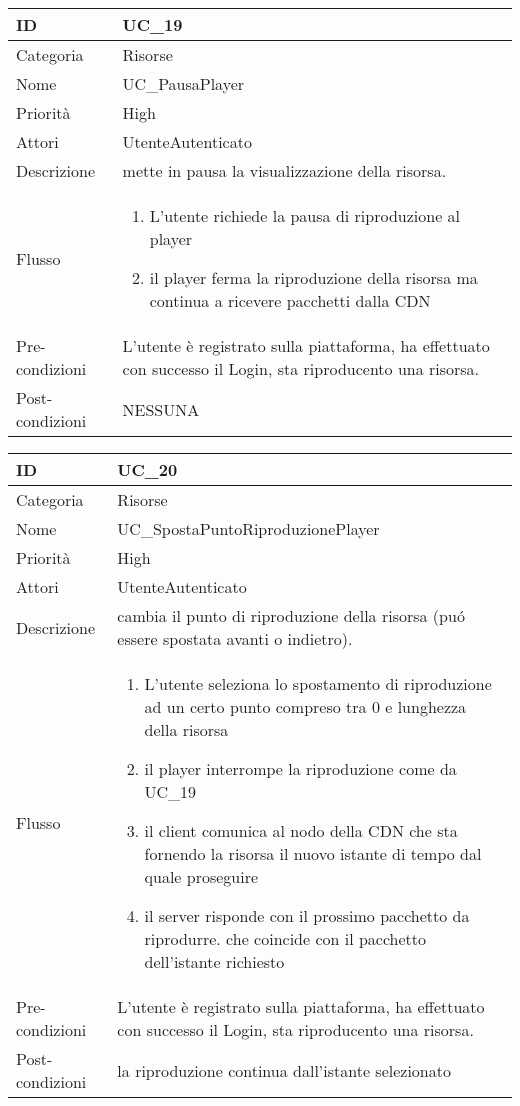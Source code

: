 \begin{center}
\begin{tabular}{ |p{2cm}|p{13cm}|  }
\hline
ID & UC\_19 \\\hline
Categoria & Risorse\\\hline
Nome & UC\_PausaPlayer\\\hline
Priorità & High \\\hline
Attori &  UtenteAutenticato \\\hline
Descrizione & mette in pausa la visualizzazione della risorsa.\\\hline
Flusso &  	\begin{enumerate}
			\item L'utente richiede la pausa di riproduzione al player
			\item il player ferma la riproduzione della risorsa ma continua a ricevere pacchetti dalla CDN 
			\end{enumerate}
			\\\hline
Pre-condizioni & L'utente è registrato sulla piattaforma, ha effettuato con successo il Login, sta riproducento una risorsa.\\\hline
Post-condizioni & NESSUNA\\\hline
\end{tabular}
\label{table_use_case:19}\newline

\begin{tabular}{ |p{2cm}|p{13cm}|  }
\hline
ID & UC\_20 \\\hline
Categoria & Risorse\\\hline
Nome & UC\_SpostaPuntoRiproduzionePlayer\\\hline
Priorità & High \\\hline
Attori &  UtenteAutenticato \\\hline
Descrizione & cambia il punto di riproduzione della risorsa (pu\'o essere spostata avanti o indietro).\\\hline
Flusso &  	\begin{enumerate}
			\item L'utente seleziona lo spostamento di riproduzione ad un certo punto compreso tra 0 e lunghezza della risorsa
			\item il player interrompe la riproduzione come da UC\_19
			\item il client comunica al nodo della CDN che sta fornendo la risorsa il nuovo istante di tempo dal quale proseguire
			\item il server risponde con il prossimo pacchetto da riprodurre. che coincide con il pacchetto dell'istante richiesto
			\end{enumerate}
			\\\hline
Pre-condizioni & L'utente è registrato sulla piattaforma, ha effettuato con successo il Login, sta riproducento una risorsa.\\\hline
Post-condizioni & la riproduzione continua dall'istante selezionato\\\hline
\end{tabular}
\label{table_use_case:20}\newline


\end{center}